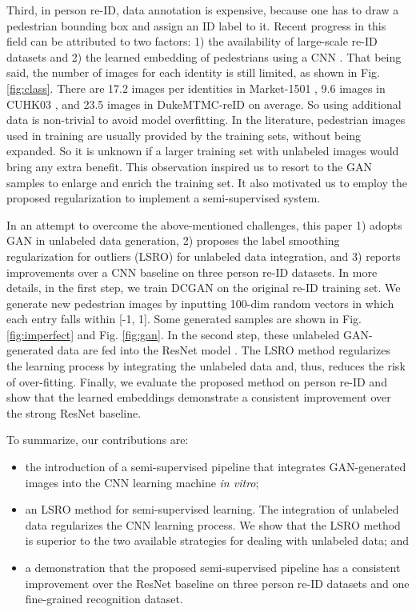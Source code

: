 \documentclass[10pt,twocolumn,letterpaper]{article}
\begin{document}
Third, in person re-ID, data annotation is expensive, because one has to draw a pedestrian bounding box and assign an ID label to it. Recent progress in this field can be attributed to two factors: 1) the availability of large-scale re-ID datasets \cite{zheng2015scalable,zheng2016person,xiao2016end,li2014deepreid} and 2) the learned embedding of pedestrians using a CNN \cite{cheng2016person,geng2016deep}. That being said, the number of images for each identity is still limited, as shown in Fig. \ref{fig:class}. There are 17.2 images per identities in Market-1501 \cite{zheng2015scalable}, 9.6 images in CUHK03 \cite{li2014deepreid}, and 23.5 images in DukeMTMC-reID \cite{ristani2016MTMC} on average. So using additional data is non-trivial to avoid model overfitting. In the literature, pedestrian images used in training are usually provided by the training sets, without being expanded. So it is unknown if a larger training set with unlabeled images would bring any extra benefit. This observation inspired us to resort to the GAN samples to enlarge and enrich the training set. It also motivated us to employ the proposed regularization to implement a semi-supervised system. 




In an attempt to overcome the above-mentioned challenges, this paper 1) adopts GAN in unlabeled data generation, 2) proposes the label smoothing regularization for outliers (LSRO) for unlabeled data integration, and 3) reports improvements over a CNN baseline on three person re-ID datasets. In more details, in the first step, we train DCGAN \cite{radford2015unsupervised} on the original re-ID training set. We generate new pedestrian images by inputting 100-dim random vectors in which each entry falls within [-1, 1]. Some generated samples are shown in Fig. \ref{fig:imperfect} and Fig. \ref{fig:gan}.  In the second step, these unlabeled GAN-generated data are fed into the ResNet model \cite{he2016deep}. The LSRO method regularizes the learning process by integrating the unlabeled data and, thus, reduces the risk of over-fitting. 
Finally, we evaluate the proposed method on person re-ID and show that the learned embeddings demonstrate a consistent improvement over the strong ResNet baseline.









To summarize, our contributions are:

\begin{itemize}
\item the introduction of a semi-supervised pipeline that integrates GAN-generated images into the CNN learning machine \emph{in vitro};
\item an LSRO method for semi-supervised learning. The integration of unlabeled data regularizes the CNN learning process. We show that the LSRO method is superior to the two available strategies for dealing with unlabeled data; and
\item a demonstration that the proposed semi-supervised pipeline has a consistent improvement over the ResNet baseline on three person re-ID datasets and one fine-grained recognition dataset. 
\end{itemize}
\end{document}
